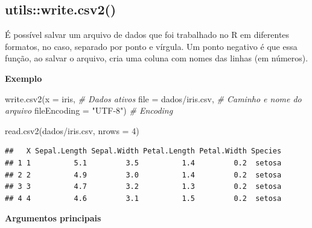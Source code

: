 \documentclass[
]{book}
\newenvironment{Shaded}{\begin{snugshade}}{\end{snugshade}}
\newcommand{\AttributeTok}[1]{\textcolor[rgb]{0.77,0.63,0.00}{#1}}
\newcommand{\CommentTok}[1]{\textcolor[rgb]{0.56,0.35,0.01}{\textit{#1}}}
\newcommand{\DecValTok}[1]{\textcolor[rgb]{0.00,0.00,0.81}{#1}}
\newcommand{\FunctionTok}[1]{\textcolor[rgb]{0.00,0.00,0.00}{#1}}
\newcommand{\NormalTok}[1]{#1}
\newcommand{\StringTok}[1]{\textcolor[rgb]{0.31,0.60,0.02}{#1}}
\theoremstyle{definition}
\theoremstyle{definition}
\theoremstyle{definition}
\theoremstyle{definition}
\theoremstyle{remark}
\begin{document}
\hypertarget{utilswrite.csv2}{%
\subsection{utils::write.csv2()}\label{utilswrite.csv2}}

É possível salvar um arquivo de dados que foi trabalhado no R em diferentes formatos, no caso, separado por ponto e vírgula. Um ponto negativo é que essa função, ao salvar o arquivo, cria uma coluna com nomes das linhas (em números).

\textbf{Exemplo}

\begin{Shaded}
\begin{Highlighting}[]
\FunctionTok{write.csv2}\NormalTok{(}\AttributeTok{x =}\NormalTok{ iris,                }\CommentTok{\# Dados ativos}
           \AttributeTok{file =} \StringTok{\textquotesingle{}dados/iris.csv\textquotesingle{}}\NormalTok{, }\CommentTok{\# Caminho e nome do arquivo}
           \AttributeTok{fileEncoding =} \StringTok{"UTF{-}8"}\NormalTok{)  }\CommentTok{\# Encoding}

\FunctionTok{read.csv2}\NormalTok{(}\StringTok{\textquotesingle{}dados/iris.csv\textquotesingle{}}\NormalTok{, }\AttributeTok{nrows =} \DecValTok{4}\NormalTok{)}
\end{Highlighting}
\end{Shaded}

\begin{verbatim}
##   X Sepal.Length Sepal.Width Petal.Length Petal.Width Species
## 1 1          5.1         3.5          1.4         0.2  setosa
## 2 2          4.9         3.0          1.4         0.2  setosa
## 3 3          4.7         3.2          1.3         0.2  setosa
## 4 4          4.6         3.1          1.5         0.2  setosa
\end{verbatim}

\textbf{Argumentos principais}
\end{document}
